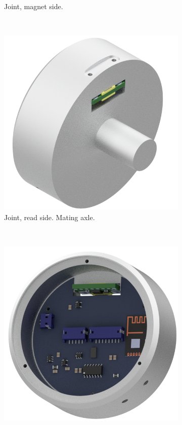 \begin{figure}[H]
\begin{minipage}{.4\linewidth}
\begin{subfigure}[t]{\linewidth}
			\caption{Joint, magnet side.}
			\label{sfig:magnetside}
		\end{subfigure}\\
		\begin{subfigure}[b]{\linewidth}
			\centering
			\includegraphics[width=\linewidth]{graphics/joint_read_side}
			\caption{Joint, read side. Mating axle.}
			\label{sfig:readside}
		\end{subfigure}\\
		\begin{subfigure}[b]{\linewidth}
			\centering
			\includegraphics[width=\linewidth]{graphics/joint_read_side_2}

\end{subfigure}
\end{minipage}
\end{figure}
